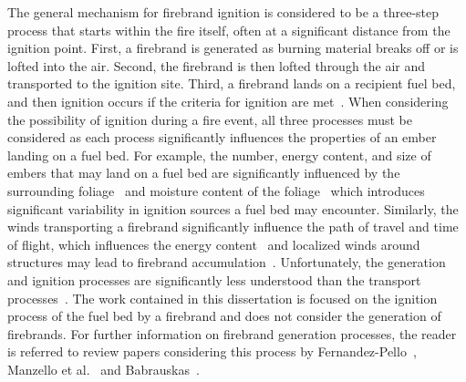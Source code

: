     The general mechanism for firebrand ignition is considered to be a three-step process that starts within the fire itself, often at a significant distance from the ignition point. First, a firebrand is generated as burning material breaks off or is lofted into the air. Second, the firebrand is then lofted through the air and transported to the ignition site. Third, a firebrand lands on a recipient fuel bed, and then ignition occurs if the criteria for ignition are met~\cite{Babrauskas2003}. When considering the possibility of ignition during a fire event, all three processes must be considered as each process significantly influences the properties of an ember landing on a fuel bed. For example, the number, energy content, and size of embers that may land on a fuel bed are significantly influenced by the surrounding foliage~\cite{Hudson2020EffectsScale} and moisture content of the foliage~\cite{Adusumilli2021FirebrandShrub} which introduces significant variability in ignition sources a fuel bed may encounter. Similarly, the winds transporting a firebrand significantly influence the path of travel and time of flight, which influences the energy content~\cite{Sardoy2007, MatvienkoOVA2016} and localized winds around structures may lead to firebrand accumulation~\cite{Suzuki2020a, Suzuki2017a, Suzuki2015}. Unfortunately, the generation and ignition processes are significantly less understood than the transport processes~\cite{Manzello2020}. The work contained in this dissertation is focused on the ignition process of the fuel bed by a firebrand and does not consider the generation of firebrands. For further information on firebrand generation processes, the reader is referred to review papers considering this process by Fernandez-Pello~\cite{Fernandez-Pello2017}, Manzello et al.~\cite{Manzello2020} and Babrauskas~\cite{Babrauskas2003}.
    
